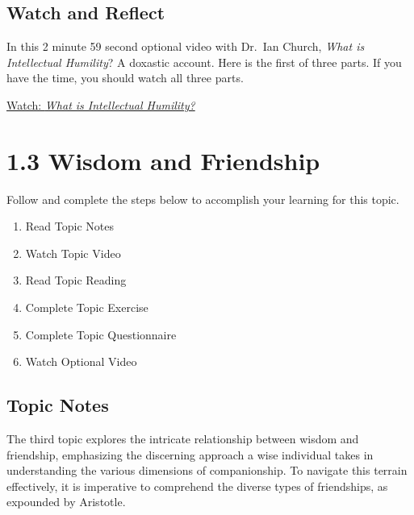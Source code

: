 \documentclass[
]{book}
\providecommand{\tightlist}{%
  \setlength{\itemsep}{0pt}\setlength{\parskip}{0pt}}
\begin{document}
\hypertarget{watch-and-reflect-3}{%
\subsection*{Watch and Reflect}\label{watch-and-reflect-3}}

\begin{reflect}
In this 2 minute 59 second optional video with Dr.~Ian Church, \emph{What is Intellectual Humility}? A doxastic account. Here is the first of three parts. If you have the time, you should watch all three parts.

\href{https://www.youtube.com/watch?v=8CZIkGEJYRY}{Watch: \emph{What is Intellectual Humility?}}
\end{reflect}

\hypertarget{wisdom-and-friendship}{%
\section*{1.3 Wisdom and Friendship}\label{wisdom-and-friendship}}

Follow and complete the steps below to accomplish your learning for this topic.

\begin{enumerate}
\def\labelenumi{\arabic{enumi}.}
\tightlist
\item
  Read Topic Notes
\item
  Watch Topic Video
\item
  Read Topic Reading
\item
  Complete Topic Exercise
\item
  Complete Topic Questionnaire
\item
  Watch Optional Video
\end{enumerate}

\hypertarget{topic-notes-2}{%
\subsection*{Topic Notes}\label{topic-notes-2}}

The third topic explores the intricate relationship between wisdom and friendship, emphasizing the discerning approach a wise individual takes in understanding the various dimensions of companionship. To navigate this terrain effectively, it is imperative to comprehend the diverse types of friendships, as expounded by Aristotle.
\end{document}
